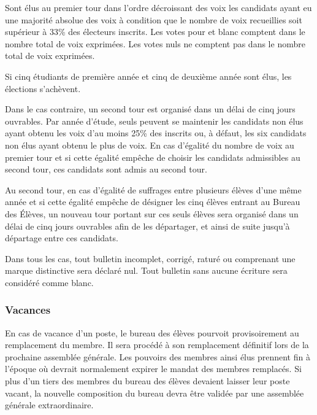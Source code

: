 \documentclass{article}
\begin{document}
				\begin{adjustwidth}{1cm}{}
				Sont élus au premier tour dans l’ordre décroissant des voix les
					candidats ayant eu une majorité absolue des voix à condition
					que le nombre de voix recueillies soit supérieur à 33\% des
					électeurs inscrits. Les votes pour et blanc comptent dans le
					nombre total de voix exprimées. Les votes nuls ne comptent
					pas dans le nombre total de voix exprimées.

					Si cinq étudiants de première année et cinq de deuxième
					année sont élus, les élections s’achèvent.
				
					Dans le cas contraire, un second tour est organisé dans un
					délai de cinq jours ouvrables. Par année d’étude, seuls
					peuvent se maintenir les candidats non élus ayant obtenu les
					voix d’au moins 25\% des inscrits ou, à défaut, les six
					candidats non élus ayant obtenu le plus de voix. En cas
					d’égalité du nombre de voix au premier tour et si cette
					égalité empêche de choisir les candidats admissibles au
					second tour, ces candidats sont admis au second tour.

					Au second tour, en cas d'égalité de suffrages entre
					plusieurs élèves d'une même année et si cette égalité
					empêche de désigner les cinq élèves entrant au Bureau des
					Élèves, un nouveau tour portant sur ces seuls élèves sera
					organisé dans un délai de cinq jours ouvrables afin de les
					départager, et ainsi de suite jusqu’à départage entre ces
					candidats.
				\end{adjustwidth}

				Dans tous les cas, tout bulletin incomplet, corrigé, raturé ou
				comprenant une marque distinctive sera déclaré nul. Tout
				bulletin sans aucune écriture sera considéré comme blanc.

			\subsubsection{Vacances}
				En cas de vacance d'un poste, le bureau des élèves pourvoit
				provisoirement au remplacement du membre. Il sera procédé à son
				remplacement définitif lors de la prochaine assemblée générale.
				Les pouvoirs des membres ainsi élus prennent fin à l’époque où
				devrait normalement expirer le mandat des membres remplacés. Si
				plus d’un tiers des membres du bureau des élèves devaient
				laisser leur poste vacant, la nouvelle composition du bureau
				devra être validée par une assemblée générale extraordinaire.
\end{document}
